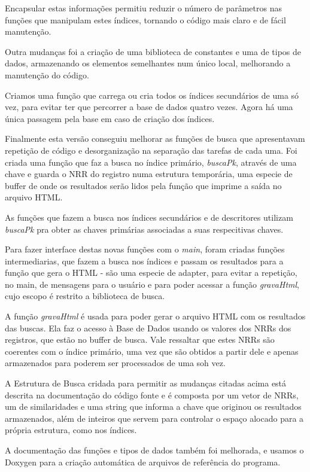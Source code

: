 \documentclass[10pt,a4paper,draft]{article}
\begin{document}
Encapsular estas informações permitiu reduzir o número de parâmetros nas
funções que manipulam estes índices, tornando o código mais claro e de fácil
manutenção.

Outra mudanças foi a criação de uma biblioteca de constantes e uma de tipos de
dados, armazenando os elementos semelhantes num único local, melhorando a
manutenção do código.

Criamos uma função que carrega ou cria todos os índices secundários de uma só
vez, para evitar ter que percorrer a base de dados quatro vezes. Agora há uma
única passagem pela base em caso de criação dos índices.

Finalmente esta versão conseguiu melhorar as funções de busca que apresentavam repetição de código e desorganização na separação das tarefas de cada uma. Foi criada uma função que faz a busca no índice primário, \textit{buscaPk}, através de uma chave e guarda o NRR do registro numa estrutura temporária, uma especie de buffer de onde os resultados serão lidos pela função que imprime a saída no arquivo HTML.

As funções que fazem a busca nos índices secundários e de descritores utilizam \textit{buscaPk} pra obter as chaves primárias associadas a suas respecitivas chaves.

Para fazer interface destas novas funções com o \textit{main}, foram criadas funções intermediarias, que fazem a busca nos índices e passam os resultados para a função que gera o HTML - são uma especie de adapter, para evitar a repetição, no main, de mensagens para o usuário e para poder acessar a função \textit{gravaHtml}, cujo escopo é restrito a biblioteca de busca.

A função \textit{gravaHtml} é usada para poder gerar o arquivo HTML com os resultados das buscas. Ela faz o acesso à Base de Dados usando os valores dos NRRs dos registros, que estão no buffer de busca. Vale ressaltar que estes NRRs são coerentes com o índice primário, uma vez que são obtidos a partir dele e apenas armazenados para poderem ser processados de uma soh vez.

A Estrutura de Busca cridada para permitir as mudanças citadas acima está descrita na documentação do código fonte e é composta por um vetor de NRRs, um de similaridades e uma string que informa a chave que originou os resultados armazenados, além de inteiros que servem para controlar o espaço alocado para a própria estrutura, como nos índices.

A documentação das funções e tipos de dados também foi melhorada, e usamos o
Doxygen para a criação automática de arquivos de referência do programa.
\end{document}
